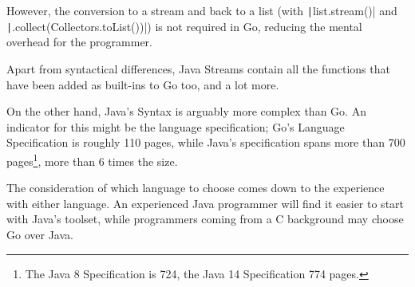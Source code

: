 

However, the conversion to a stream and back to a list (with \texttt|list.stream()| and
\texttt|.collect(Collectors.toList())|)
is not required in Go, reducing the mental overhead for the programmer.

Apart from syntactical differences, Java Streams contain all the functions that
have been added as built-ins to Go too, and a lot more.

On the other hand, Java's Syntax is arguably more complex than Go. An indicator for this might be
the language specification; Go's Language Specification is roughly 110 pages, while
Java's specification spans more than 700 pages\footnote{
	The Java 8 Specification is 724\autocite{java-8-spec}, the Java 14
	Specification 774\autocite{java-14-spec} pages.}, more than 6 times the size.

The consideration of which language to choose comes down to the experience with either language.
An experienced Java programmer will find it easier to start with Java's toolset, while programmers
coming from a C background may choose Go over Java.
